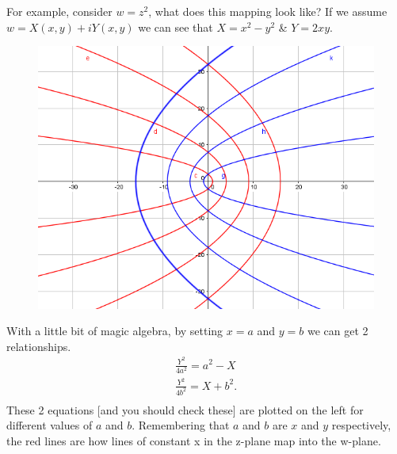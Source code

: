  For example, consider $w=z^2$, what does this mapping look like?
 If we assume $w=X(x,y)+iY(x,y)$ we can see that $X=x^2-y^2$ \& $Y=2xy$.
%
\begin{minipage}[t]{0.47\linewidth}
	\begin{figure}[H]
		\centering
		\includegraphics[width=\linewidth]{complex/mapping}
		\captionsetup{font=small} 	
	\end{figure} 
\end{minipage}
\hspace{0.6cm}
%
\begin{minipage}[t]{0.47\linewidth}
	\vspace{0.3cm}
	With a little bit of magic algebra, by setting $x=a$ and $y=b$ we can get 2 relationships.
	\begin{align*}
	\frac{Y^2}{4a^2}=a^2-X \\
	\frac{Y^2}{4b^2}=X+b^2. \\
	\end{align*}
These 2 equations [and you should check these] are plotted on the left for different values of $a$ and $b$.
 Remembering that $a$ and $b$ are $x$ and $y$ respectively, the red lines are how lines of constant x in the z-plane map into the w-plane.
\end{minipage}
%
%
